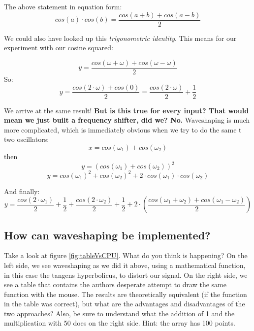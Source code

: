 The above statement in equation form:
\begin{equation}
	cos(a)\cdot cos(b) = \frac{cos(a+b) + cos(a-b)}{2}
\end{equation}

We could also have looked up this \textit{trigonometric identity}.
This means for our experiment with our cosine squared:

\begin{equation}
y = \frac{cos(\omega+\omega) + cos(\omega-\omega)}{2}
\end{equation}
So:
\begin{equation}
y = \frac{cos(2 \cdot \omega) + cos(0)}{2} = \frac{cos(2 \cdot \omega )}{2}+\frac{1}{2}
\end{equation}

We arrive at the same result!
\textbf{But is this true for every input? That would mean we just built a frequency shifter, did we? No.} Waveshaping is much more complicated, which is immediately obvious when we try to do the same t two oscillators:
\begin{equation}
x = cos(\omega_1)+cos(\omega_2)
\end{equation}
then
\begin{equation}
y = (cos(\omega_1)+cos(\omega_2) ) ^2
\end{equation}
\begin{equation}
y = cos(\omega_1)^2+cos(\omega_2)^2+2\cdot cos(\omega_1) \cdot cos(\omega_2)
\end{equation}

And finally:
\begin{equation}
	y = \frac{cos(2 \cdot \omega_1)}{2} + \frac{1}{2} + \frac{cos(2 \cdot \omega_2)}{2} +\frac{1}{2} + 2 \cdot (\frac{cos(\omega_1+\omega_2) + cos(\omega_1-\omega_2)}{2})
\end{equation}

\subsection{How can waveshaping be implemented?} %
\label{sub:how_can_waveshaping_be_implemented_}


Take a look at figure \ref{fig:tableVsCPU}. What do you think is happening?
On the left side, we see waveshaping as we did it above, using a mathematical function, in this case the tangens hyperbolicus, to distort our signal. On the right side, we see a table that contains the authors desperate attempt to draw the same function with the mouse. The results are theoretically equivalent (if the function in the table was correct), but what are the advantages and disadvantages of the two approaches?
Also, be sure to understand what the addition of 1 and the multiplication with 50 does on the right side. Hint: the array has 100 points.

